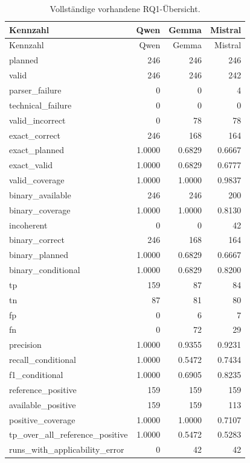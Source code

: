 \begingroup\small
\begin{longtable}{lrrr}
\caption{Vollständige vorhandene RQ1-Übersicht.}\label{tab_v2_rq1_full}\\
\toprule
Kennzahl & Qwen & Gemma & Mistral \\
\midrule
\endfirsthead
\toprule
Kennzahl & Qwen & Gemma & Mistral \\
\midrule
\endhead
planned & 246 & 246 & 246 \\
valid & 246 & 246 & 242 \\
parser\_failure & 0 & 0 & 4 \\
technical\_failure & 0 & 0 & 0 \\
valid\_incorrect & 0 & 78 & 78 \\
exact\_correct & 246 & 168 & 164 \\
exact\_planned & 1.0000 & 0.6829 & 0.6667 \\
exact\_valid & 1.0000 & 0.6829 & 0.6777 \\
valid\_coverage & 1.0000 & 1.0000 & 0.9837 \\
binary\_available & 246 & 246 & 200 \\
binary\_coverage & 1.0000 & 1.0000 & 0.8130 \\
incoherent & 0 & 0 & 42 \\
binary\_correct & 246 & 168 & 164 \\
binary\_planned & 1.0000 & 0.6829 & 0.6667 \\
binary\_conditional & 1.0000 & 0.6829 & 0.8200 \\
tp & 159 & 87 & 84 \\
tn & 87 & 81 & 80 \\
fp & 0 & 6 & 7 \\
fn & 0 & 72 & 29 \\
precision & 1.0000 & 0.9355 & 0.9231 \\
recall\_conditional & 1.0000 & 0.5472 & 0.7434 \\
f1\_conditional & 1.0000 & 0.6905 & 0.8235 \\
reference\_positive & 159 & 159 & 159 \\
available\_positive & 159 & 159 & 113 \\
positive\_coverage & 1.0000 & 1.0000 & 0.7107 \\
tp\_over\_all\_reference\_positive & 1.0000 & 0.5472 & 0.5283 \\
runs\_with\_applicability\_error & 0 & 42 & 42 \\
\bottomrule
\end{longtable}
\endgroup
